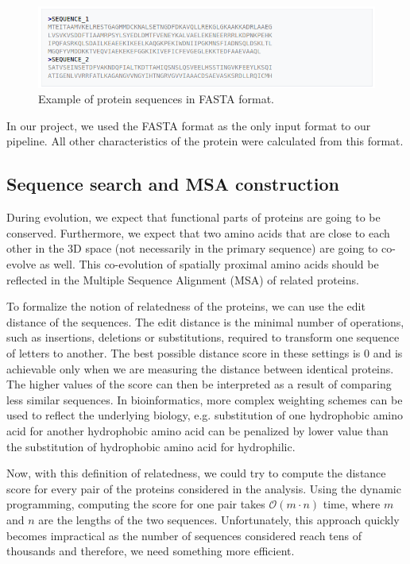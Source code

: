\begin{figure}[ht]
    \centering
    \includegraphics[width=\linewidth]{imgs_andy/fasta.png}
    \caption{Example of protein sequences in FASTA format.}
    \label{fig:fasta}
\end{figure}

In our project, we used the FASTA format as the only input format to our pipeline.
All other characteristics of the protein were calculated from this format.

\subsection{Sequence search and MSA construction}

During evolution, we expect that functional parts of proteins are going to be conserved. 
Furthermore, we expect that two amino acids that are close to each other in the 3D space (not necessarily in the primary sequence) are going to co-evolve as well. 
This co-evolution of spatially proximal amino acids should be reflected in the Multiple Sequence Alignment (MSA) of related proteins.

To formalize the notion of relatedness of the proteins, we can use the edit distance of the sequences.
The edit distance is the minimal number of operations, such as insertions, deletions or substitutions, required to transform one sequence of letters to another.
The best possible distance score in these settings is 0 and is achievable only when we are measuring the distance between identical proteins.
The higher values of the score can then be interpreted as a result of comparing less similar sequences.
In bioinformatics, more complex weighting schemes can be used to reflect the underlying biology, e.g. substitution of one hydrophobic amino acid for another hydrophobic amino acid can be penalized by lower value than the substitution of hydrophobic amino acid for hydrophilic. 

Now, with this definition of relatedness, we could try to compute the distance score for every pair of the proteins considered in the analysis.
Using the dynamic programming, computing the score for one pair takes $\mathcal{O}(m \cdot n)$ time, where $m$ and $n$ are the lengths of the two sequences.
Unfortunately, this approach quickly becomes impractical as the number of sequences considered reach tens of thousands and therefore, we need something more efficient.


